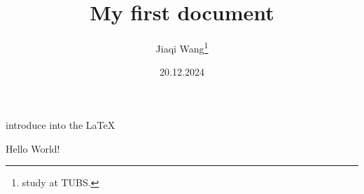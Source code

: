 \documentclass[12pt, letterpaper]{article}
\title{My first document}
\date{20.12.2024}
\author{Jiaqi Wang\thanks{study at TUBS.}}
\begin{document}
  
  \maketitle
  introduce into the \LaTeX{}
  \newpage

  Hello World!
\end{document}
